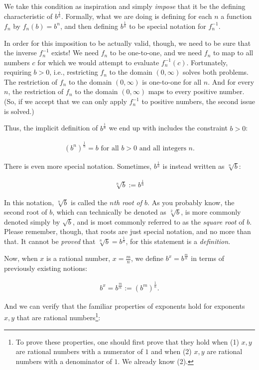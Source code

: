 We take this condition as inspiration and simply \textit{impose} that it be the defining characteristic of $b^{\frac{1}{n}}$. Formally, what we are doing is defining for each $n$ a function $f_n$ by $f_n(b) = b^n$, and then defining $b^{\frac{1}{n}}$ to be special notation for $f_n^{-1}$. 

In order for this imposition to be actually valid, though, we need to be sure that the inverse $f_n^{-1}$ exists! We need $f_n$ to be one-to-one, and we need $f_n$ to map to all numbers $c$ for which we would attempt to evaluate $f_n^{-1}(c)$. Fortunately, requiring $b > 0$, i.e., restricting $f_n$ to the domain $(0, \infty)$ solves both problems. The restriction of $f_n$ to the domain $(0, \infty)$ is one-to-one for all $n$. And for every $n$, the restriction of $f_n$ to the domain $(0, \infty)$ maps to every positive number. (So, if we accept that we can only apply $f_n^{-1}$ to positive numbers, the second issue is solved.)

Thus, the implicit definition of $b^{\frac{1}{n}}$ we end up with includes the constraint $b > 0$:

\begin{align*}
    (b^n)^{\frac{1}{n}} = b \text{ for all $b > 0$ and all integers $n$}.
\end{align*}

There is even more special notation. Sometimes, $b^{\frac{1}{n}}$ is instead written as $\sqrt[n]{b}$:

\begin{align*}
    \sqrt[n]{b} := b^{\frac{1}{n}}
\end{align*}

In this notation, $\sqrt[n]{b}$ is called the \textit{$n$th root of $b$}. As you probably know, the second root of $b$, which can technically be denoted as $\sqrt[2]{b}$, is more commonly denoted simply by $\sqrt{b}$, and is most commonly referred to as the \textit{square root} of $b$.  Please remember, though, that roots are just special notation, and no more than that. It cannot be \textit{proved} that $\sqrt[n]{b} = b^{\frac{1}{n}}$, for this statement is a \textit{definition}.

Now, when $x$ is a rational number, $x = \frac{m}{n}$, we define $b^x = b^{\frac{m}{n}}$ in terms of previously existing notions:

\begin{align*}
    b^x = b^{\frac{m}{n}} := (b^m)^{\frac{1}{n}}.
\end{align*}

And we can verify that the familiar properties of exponents hold for exponents $x, y$ that are rational numbers\footnote{To prove these properties, one should first prove that they hold when (1) $x, y$ are rational numbers with a numerator of $1$ and when (2) $x, y$ are rational numbers with a denominator of $1$. We already know (2).}:

